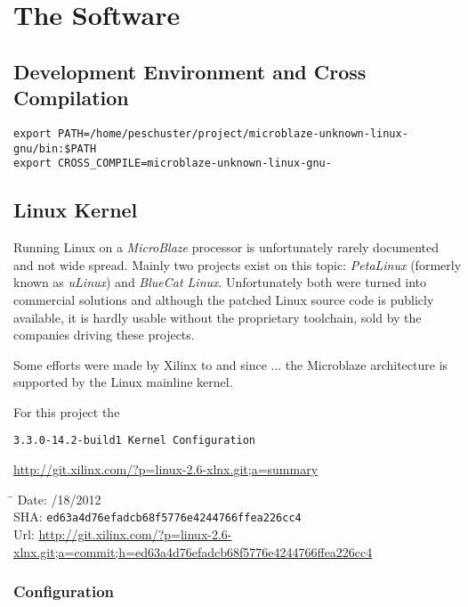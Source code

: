 \section{The Software}

\subsection{Development Environment and Cross Compilation}

\begin{verbatim}
export PATH=/home/peschuster/project/microblaze-unknown-linux-gnu/bin:$PATH
export CROSS_COMPILE=microblaze-unknown-linux-gnu-
\end{verbatim}

\subsection{Linux Kernel}

Running Linux on a \textit{MicroBlaze} processor is unfortunately rarely documented and not wide spread. Mainly two projects exist on this topic: \textit{PetaLinux} (formerly known as \textit{uLinux}) and \textit{BlueCat Linux}. Unfortunately both were turned into commercial solutions and although the patched Linux source code is publicly available, it is hardly usable without the proprietary toolchain, sold by the companies driving these projects.

Some efforts were made by Xilinx to and since ... the Microblaze architecture is supported by the Linux mainline kernel.

For this project the 

\texttt{3.3.0-14.2-build1 Kernel Configuration}

\url{http://git.xilinx.com/?p=linux-2.6-xlnx.git;a=summary}

\begin{tabbing}
\hspace*{1.5cm}\= \kill
Date: /18/2012\\
SHA: \>\texttt{ed63a4d76efadcb68f5776e4244766ffea226cc4}\\
Url: \>\url{http://git.xilinx.com/?p=linux-2.6-xlnx.git;a=commit;h=ed63a4d76efadcb68f5776e4244766ffea226cc4}
\end{tabbing}

\subsubsection{Configuration}

